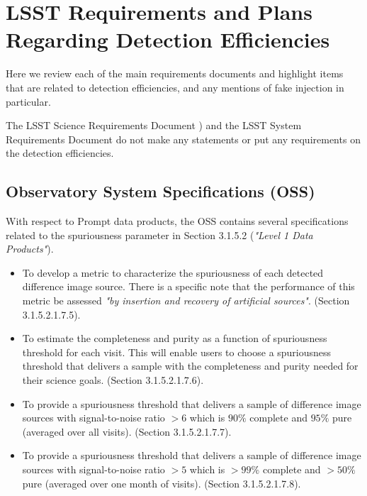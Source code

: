 \documentclass[DM,lsstdraft,toc]{lsstdoc}
\begin{document}
\section{LSST Requirements and Plans Regarding Detection Efficiencies}\label{sec:docs}

Here we review each of the main requirements documents and highlight items that are related to detection efficiencies, and any mentions of fake injection in particular.

The LSST Science Requirements Document ) and the LSST System Requirements Document  do not make any statements or put any requirements on the detection efficiencies.

\subsection{Observatory System Specifications (OSS)}\label{ssec:docs_oss}

With respect to Prompt data products, the OSS  contains several specifications related to the spuriousness parameter in Section 3.1.5.2 ({\it "Level 1 Data Products"}).
\begin{itemize}
\item To develop a metric to characterize the spuriousness of each detected difference image source. There is a specific note that the performance of this metric be assessed {\it "by insertion and recovery of artificial sources"}. (Section 3.1.5.2.1.7.5). 
\item To estimate the completeness and purity as a function of spuriousness threshold for each visit. This will enable users to choose a spuriousness threshold that delivers a sample with the completeness and purity needed for their science goals. (Section 3.1.5.2.1.7.6).
\item To provide a spuriousness threshold that delivers a sample of difference image sources with signal-to-noise ratio $>6$ which is $90\%$ complete and $95\%$ pure (averaged over all visits). (Section 3.1.5.2.1.7.7).
\item To provide a spuriousness threshold that delivers a sample of difference image sources with signal-to-noise ratio $>5$ which is $>99\%$ complete and $>50\%$ pure (averaged over one month of visits). (Section 3.1.5.2.1.7.8).
\end{itemize}
\end{document}

